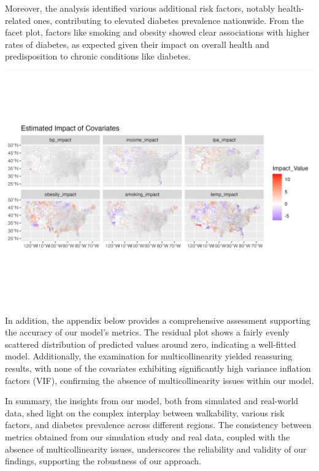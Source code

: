 \documentclass[
]{article}
\begin{document}
Moreover, the analysis identified various additional risk factors,
notably health-related ones, contributing to elevated diabetes
prevalence nationwide. From the facet plot, factors like smoking and
obesity showed clear associations with higher rates of diabetes, as
expected given their impact on overall health and predisposition to
chronic conditions like diabetes.

\begin{center}
\includegraphics{facet_plot.png}
\end{center}

In addition, the appendix below provides a comprehensive assessment
supporting the accuracy of our model's metrics. The residual plot shows
a fairly evenly scattered distribution of predicted values around zero,
indicating a well-fitted model. Additionally, the examination for
multicollinearity yielded reassuring results, with none of the
covariates exhibiting significantly high variance inflation factors
(VIF), confirming the absence of multicollinearity issues within our
model.

In summary, the insights from our model, both from simulated and
real-world data, shed light on the complex interplay between
walkability, various risk factors, and diabetes prevalence across
different regions. The consistency between metrics obtained from our
simulation study and real data, coupled with the absence of
multicollinearity issues, underscores the reliability and validity of
our findings, supporting the robustness of our approach.
\end{document}
